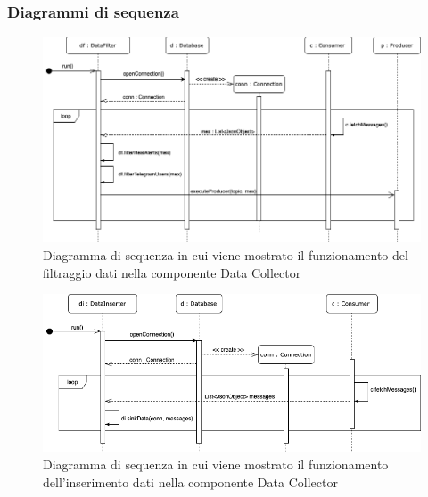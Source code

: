 	\begin{landscape}
	\subsubsection{Diagrammi di sequenza}%
		\begin{figure}[H]
			\centering
			\includegraphics[scale=0.550]{res/images/DATACOLLECTOR/DataFilter.ThreadsKafkaDataCollector.png}
			\caption{Diagramma di sequenza in cui viene mostrato il funzionamento del filtraggio dati nella componente Data Collector}
			\label{Diagramma 7}
		\end{figure}
		\begin{figure}[H]
			\centering
			\includegraphics[scale=0.550]{res/images/DATACOLLECTOR/DataInserter.ThreadsKafkaDataCollector.png}
			\caption{Diagramma di sequenza in cui viene mostrato il funzionamento dell'inserimento dati nella componente Data Collector}
			\label{Diagramma 8}
		\end{figure}
	\end{landscape}